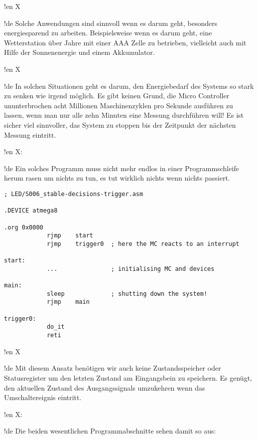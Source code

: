 !en X

!de Solche Anwendungen sind sinnvoll wenn es darum geht, besonders energiesparend zu arbeiten. Beispielsweise wenn es darum geht, eine Wetterstation über Jahre mit einer AAA Zelle zu betrieben, vielleicht auch mit Hilfe der Sonnenenergie und einem Akkumulator.



!en X

!de In solchen Situationen geht es darum, den Energiebedarf des Systems so stark zu senken wie irgend möglich. Es gibt keinen Grund, die Micro Controller ununterbrochen acht Millionen Maschinenzyklen pro Sekunde ausführen zu lassen, wenn man nur alle zehn Minuten eine Messung durchführen will! Es ist sicher viel sinnvoller, das System zu stoppen bis der Zeitpunkt der nächsten Messung eintritt.



!en X:

!de Ein solches Programm muss nicht mehr endlos in einer Programmschleife herum rasen um nichts zu tun, es tut wirklich nichts wenn nichts passiert.



\begin{lstlisting}
; LED/S006_stable-decisions-trigger.asm

.DEVICE atmega8

.org 0x0000
            rjmp    start
            rjmp    trigger0  ; here the MC reacts to an interrupt
            
start:
            ...               ; initialising MC and devices
            
main:
            sleep             ; shutting down the system!
            rjmp    main

trigger0:
            do_it
            reti
\end{lstlisting}

!en X

!de Mit diesem Ansatz benötigen wir auch keine Zustandsspeicher oder Statusregister um den letzten Zustand am Eingangsbein zu speichern. Es genügt, den aktuellen Zustand des Ausgangssignals umzukehren wenn das Umschaltereignis eintritt.



!en X:

!de Die beiden wesentlichen Programmabschnitte sehen damit so aus:

